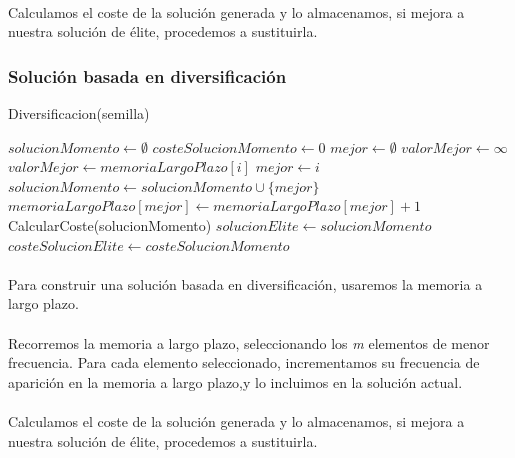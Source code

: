 \documentclass{article}
\begin{document}
		\paragraph{}Calculamos el coste de la solución generada y lo almacenamos, si mejora a nuestra solución de élite, procedemos a sustituirla. 
		
		\subsubsection{Solución basada en diversificación}
		
		\begin{algorithm}[H]
			\caption{Diversificacion(semilla)}
			\begin{algorithmic}
				\STATE $solucionMomento \leftarrow \emptyset$
				\STATE $costeSolucionMomento \leftarrow 0$
				\STATE $mejor \leftarrow \emptyset$
				\STATE $valorMejor \leftarrow \infty$
				\STATE $valorMejor \leftarrow memoriaLargoPlazo[i]$
				\STATE $mejor \leftarrow i$
				\ENDIF
				\ENDFOR
				\STATE $solucionMomento \leftarrow solucionMomento \cup \{mejor\}$
				\STATE $memoriaLargoPlazo[mejor] \leftarrow memoriaLargoPlazo[mejor]+1$
				\ENDWHILE
				\STATE CalcularCoste(solucionMomento)
				\STATE $solucionElite \leftarrow solucionMomento$
				\STATE $costeSolucionElite \leftarrow costeSolucionMomento$
				\ENDIF
			\end{algorithmic}
		\end{algorithm}
		
		\paragraph{}Para construir una solución basada en diversificación, usaremos la memoria a largo plazo.
		
		\paragraph{}Recorremos la memoria a largo plazo, seleccionando los \emph{m} elementos de menor frecuencia. Para cada elemento seleccionado, incrementamos su frecuencia de aparición en la memoria a largo plazo,y lo incluimos en la solución actual.
		
		\paragraph{}Calculamos el coste de la solución generada y lo almacenamos, si mejora a nuestra solución de élite, procedemos a sustituirla. 
	
\end{document}
